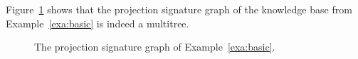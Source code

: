 \documentclass[draft]{article}
\newcommand{\ww}[1]{\textcolor{white}{#1}}
\begin{document}
Figure~\ref{fig:multitree} shows that the projection signature graph of the knowledge base from Example~\ref{exa:basic} is indeed a multitree.
%
\begin{figure}[t]
\centering
\resizebox{.7\columnwidth}{!}{

}
\vspace*{-2ex}
\caption{\label{fig:multitree} The projection signature graph of Example~\ref{exa:basic}.}
\end{figure}
\end{document}
